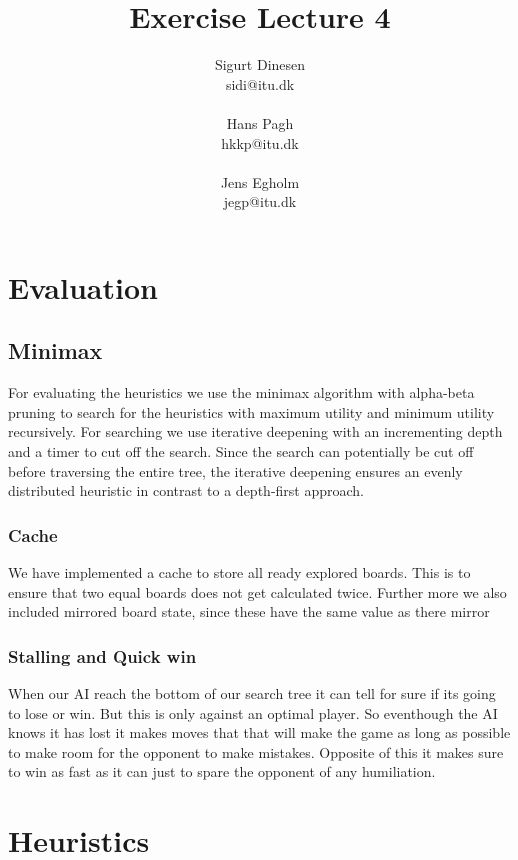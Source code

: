 \documentclass[a4paper, titlepage]{article}
\begin{document}
\title{Exercise Lecture 4}
\author{Sigurt Dinesen \\sidi@itu.dk \\\\ Hans Pagh \\hkkp@itu.dk 
\\\\Jens Egholm \\jegp@itu.dk}
\maketitle
\pagebreak

\section*{Evaluation}
\subsection*{Minimax}
For evaluating the heuristics we use the minimax algorithm with alpha-beta pruning to
search for the heuristics with maximum utility and minimum utility recursively. 
For searching we use iterative deepening with an incrementing depth and a timer to cut off
the search. Since the search can potentially be cut off before traversing the entire tree, 
the iterative deepening ensures an evenly distributed heuristic in contrast to a depth-first
approach.
\subsubsection*{Cache}
We have implemented a cache to store all ready explored boards. This is to ensure that two equal boards does not get calculated twice.
Further more we also included mirrored board state, since these have the same value as there mirror

\subsubsection*{Stalling and Quick win}
When our AI reach the bottom of our search tree it can tell for sure if its going to lose or win. But this is only against an optimal player.
So eventhough the AI knows it has lost it makes moves that that will make the game as long as possible to make room for the opponent to make mistakes.
Opposite of this it makes sure to win as fast as it can just to spare the opponent of any humiliation.

\section*{Heuristics}
\end{document}
